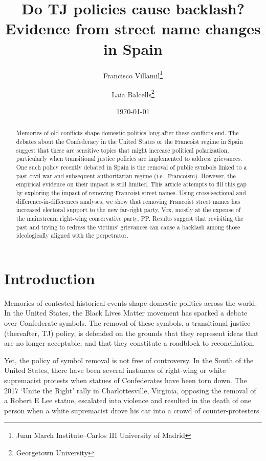 \documentclass[12pt, notitlepage]{article}
\title{\Large Do TJ policies cause backlash?\\Evidence from street name changes in Spain}
\author{Francisco Villamil\footnote{Juan March Institute--Carlos III University of Madrid} \and Laia Balcells\footnote{Georgetown University}}
\date{\today}
\begin{document}
\maketitle

\begin{abstract}
Memories of old conflicts shape domestic politics long after these conflicts end. The debates about the Confederacy in the United States or the Francoist regime in Spain suggest that these are sensitive topics that might increase political polarization, particularly when transitional justice policies are implemented to address grievances. One such policy recently debated in Spain is the removal of public symbols linked to a past civil war and subsequent authoritarian regime (i.e., Francoism). However, the empirical evidence on their impact is still limited. This article attempts to fill this gap by exploring the impact of removing Francoist street names. Using cross-sectional and difference-in-differences analyses, we show that removing Francoist street names has increased electoral support to the new far-right party, Vox, mostly at the expense of the mainstream right-wing conservative party, PP. Results suggest that revisiting the past and trying to redress the victims' grievances can cause a backlash among those ideologically aligned with the perpetrator.

\vspace{10pt}
\noindent

\end{abstract}

\newpage
\section*{Introduction}

Memories of contested historical events shape domestic politics across the world.
In the United States, the Black Lives Matter movement has sparked a debate over Confederate symbols.%
The removal of these symbols, a transitional justice (thereafter, TJ) policy, is defended on the grounds that they represent ideas that are no longer acceptable, and that they constitute a roadblock to reconciliation.

Yet, the policy of symbol removal is not free of controversy.
In the South of the United States, there have been several instances of right-wing or white supremacist protests when statues of Confederates have been torn down.
The 2017 `Unite the Right' rally in Charlottesville, Virginia, opposing the removal of a Robert E Lee statue, escalated into violence and resulted in the death of one person when a white supremacist drove his car into a crowd of counter-protesters.
\end{document}
